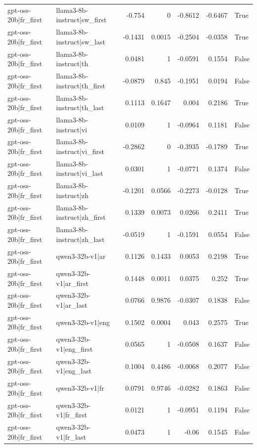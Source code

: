 \begin{table}
\begin{tabular}{l l r r r r l}
gpt-oss-20b|fr_first & llama3-8b-instruct|sw_first & -0.754 & 0 & -0.8612 & -0.6467 & True \\
gpt-oss-20b|fr_first & llama3-8b-instruct|sw_last & -0.1431 & 0.0015 & -0.2504 & -0.0358 & True \\
gpt-oss-20b|fr_first & llama3-8b-instruct|th & 0.0481 & 1 & -0.0591 & 0.1554 & False \\
gpt-oss-20b|fr_first & llama3-8b-instruct|th_first & -0.0879 & 0.845 & -0.1951 & 0.0194 & False \\
gpt-oss-20b|fr_first & llama3-8b-instruct|th_last & 0.1113 & 0.1647 & 0.004 & 0.2186 & True \\
gpt-oss-20b|fr_first & llama3-8b-instruct|vi & 0.0109 & 1 & -0.0964 & 0.1181 & False \\
gpt-oss-20b|fr_first & llama3-8b-instruct|vi_first & -0.2862 & 0 & -0.3935 & -0.1789 & True \\
gpt-oss-20b|fr_first & llama3-8b-instruct|vi_last & 0.0301 & 1 & -0.0771 & 0.1374 & False \\
gpt-oss-20b|fr_first & llama3-8b-instruct|zh & -0.1201 & 0.0566 & -0.2273 & -0.0128 & True \\
gpt-oss-20b|fr_first & llama3-8b-instruct|zh_first & 0.1339 & 0.0073 & 0.0266 & 0.2411 & True \\
gpt-oss-20b|fr_first & llama3-8b-instruct|zh_last & -0.0519 & 1 & -0.1591 & 0.0554 & False \\
gpt-oss-20b|fr_first & qwen3-32b-v1|ar & 0.1126 & 0.1433 & 0.0053 & 0.2198 & True \\
gpt-oss-20b|fr_first & qwen3-32b-v1|ar_first & 0.1448 & 0.0011 & 0.0375 & 0.252 & True \\
gpt-oss-20b|fr_first & qwen3-32b-v1|ar_last & 0.0766 & 0.9876 & -0.0307 & 0.1838 & False \\
gpt-oss-20b|fr_first & qwen3-32b-v1|eng & 0.1502 & 0.0004 & 0.043 & 0.2575 & True \\
gpt-oss-20b|fr_first & qwen3-32b-v1|eng_first & 0.0565 & 1 & -0.0508 & 0.1637 & False \\
gpt-oss-20b|fr_first & qwen3-32b-v1|eng_last & 0.1004 & 0.4486 & -0.0068 & 0.2077 & False \\
gpt-oss-20b|fr_first & qwen3-32b-v1|fr & 0.0791 & 0.9746 & -0.0282 & 0.1863 & False \\
gpt-oss-20b|fr_first & qwen3-32b-v1|fr_first & 0.0121 & 1 & -0.0951 & 0.1194 & False \\
gpt-oss-20b|fr_first & qwen3-32b-v1|fr_last & 0.0473 & 1 & -0.06 & 0.1545 & False \\

\end{tabular}
\end{table}
